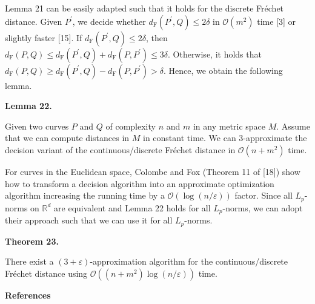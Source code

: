 \documentclass[10pt,a4paper]{article}
\begin{document}
Lemma 21 can be easily adapted such that it holds for the discrete Fréchet distance. Given $P^{\prime}$, we decide whether $d_{\text{F}}(P^{\prime},Q)\leq 2\delta$ in $\mathcal{O}(m^{2})$ time [3] or slightly faster [15]. If $d_{\text{F}}(P^{\prime},Q)\leq 2\delta$, then $d_{\text{F}}(P,Q)\leq d_{\text{F}}(P^{\prime},Q)+d_{\text{F}}(P,P^{\prime})%
\leq 3\delta$. Otherwise, it holds that $d_{\text{F}}(P,Q)\geq d_{\text{F}}(P^{\prime},Q)-d_{\text{F}}(P,P^{\prime})>\delta$. Hence, we obtain the following lemma.
\par
\par
\par\medskip\noindent\textbf{Lemma 22.}\par
Given two curves $P$ and $Q$ of complexity $n$ and $m$ in any metric space $M$. Assume that we can compute distances in $M$ in constant time. We can $3$-approximate the decision variant of the continuous/discrete Fréchet distance in $\mathcal{O}(n+m^{2})$ time.
\par
\par
\par
For curves in the Euclidean space, Colombe and Fox (Theorem 11 of [18]) show how to transform a decision algorithm into an approximate optimization algorithm increasing the running time by a $\mathcal{O}(\log(n/\varepsilon))$ factor. Since all $L_{p}$-norms on $\mathbb{R}^{d}$ are equivalent and Lemma 22 holds for all $L_{p}$-norms, we can adopt their approach such that we can use it for all $L_{p}$-norms.
\par
\par
\par\medskip\noindent\textbf{Theorem 23.}\par
There exist a $(3+\varepsilon)$-approximation algorithm for the continuous/discrete Fréchet distance using $\mathcal{O}((n+m^{2})\log(n/\varepsilon))$ time.
\par
\par
\par
\par\medskip\noindent\textbf{References}\par
\end{document}
